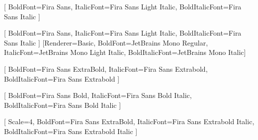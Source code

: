 \RequirePackage{microtype}
\RequirePackage{polyglossia}
\setdefaultlanguage{french}
\RequirePackage{fontspec}
\RequirePackage{amssymb}

[
  BoldFont={Fira Sans},
  ItalicFont={Fira Sans Light Italic},
  BoldItalicFont={Fira Sans Italic}
]

\setsansfont{Fira Sans Light}[
  BoldFont={Fira Sans},
  ItalicFont={Fira Sans Light Italic},
  BoldItalicFont={Fira Sans Italic}
]
\setmonofont{JetBrains Mono Light}[Renderer=Basic,
  BoldFont={JetBrains Mono Regular},
  ItalicFont={JetBrains Mono Light Italic},
  BoldItalicFont={JetBrains Mono Italic}]%

[
  BoldFont={Fira Sans ExtraBold},
  ItalicFont={Fira Sans Extrabold},
  BoldItalicFont={Fira Sans Extrabold}
]

[
  BoldFont={Fira Sans Bold},
  ItalicFont={Fira Sans Bold Italic},
  BoldItalicFont={Fira Sans Bold Italic}
]

[
  Scale=4,
  BoldFont={Fira Sans ExtraBold},
  ItalicFont={Fira Sans Extrabold Italic},
  BoldItalicFont={Fira Sans Extrabold Italic}
]